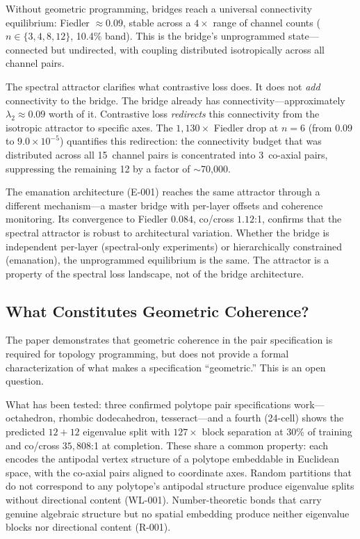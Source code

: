 Without geometric programming, bridges reach a universal connectivity
equilibrium: Fiedler $\approx 0.09$, stable across a $4\times$ range
of channel counts ($n \in \{3, 4, 8, 12\}$, 10.4\% band). This is the
bridge's unprogrammed state---connected but undirected, with coupling
distributed isotropically across all channel pairs.

The spectral attractor clarifies what contrastive loss does. It does not
\emph{add} connectivity to the bridge. The bridge already has
connectivity---approximately $\lambda_2 \approx 0.09$ worth of it.
Contrastive loss \emph{redirects} this connectivity from the isotropic
attractor to specific axes. The $1{,}130\times$ Fiedler drop at $n{=}6$
(from $0.09$ to $9.0 \times 10^{-5}$) quantifies this redirection: the
connectivity budget that was distributed across all 15~channel pairs is
concentrated into 3~co-axial pairs, suppressing the remaining 12 by
a factor of $\sim$70{,}000.

The emanation architecture (E-001) reaches the same attractor through a
different mechanism---a master bridge with per-layer offsets and
coherence monitoring. Its convergence to Fiedler $0.084$, co/cross
$1.12$:1, confirms that the spectral attractor is robust to
architectural variation. Whether the bridge is independent per-layer
(spectral-only experiments) or hierarchically constrained (emanation),
the unprogrammed equilibrium is the same. The attractor is a property
of the spectral loss landscape, not of the bridge architecture.

\subsection{What Constitutes Geometric Coherence?}
\label{sec:disc-coherence}

The paper demonstrates that geometric coherence in the pair
specification is required for topology programming, but does not
provide a formal characterization of what makes a specification
``geometric.'' This is an open question.

What has been tested: three confirmed polytope pair specifications
work---octahedron, rhombic dodecahedron, tesseract---and a fourth
(24-cell) shows the predicted $12{+}12$ eigenvalue split with
$127\times$ block separation at 30\% of training and co/cross
$35{,}808$:1 at completion. These share a common property: each encodes the antipodal
vertex structure of a polytope embeddable in Euclidean space, with the
co-axial pairs aligned to coordinate axes. Random partitions that do not
correspond to any polytope's antipodal structure produce eigenvalue
splits without directional content (WL-001). Number-theoretic bonds that
carry genuine algebraic structure but no spatial embedding produce
neither eigenvalue blocks nor directional content (R-001).

